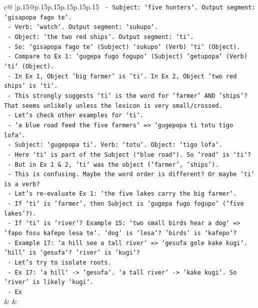 \documentclass{article}
\begin{document}
{\begin{supertabular}{c@{$\;$}|p{.15\linewidth}@{}p{.15\linewidth}p{.15\linewidth}p{.15\linewidth}p{.15\linewidth}p{.15\linewidth}}
{{{\texttt{     {-} Subject: `five hunters`. Output segment: `gisapopa fago te`.} \\
\texttt{     {-} Verb: `watch`. Output segment: `sukupo`.} \\
\texttt{     {-} Object: `the two red ships`. Output segment: `ti`.} \\
\texttt{     {-} So: `gisapopa fago te` (Subject) `sukupo` (Verb) `ti` (Object).} \\
\texttt{     {-} Compare to Ex 1: `gugepa fugo fogupo` (Subject) `getupopa` (Verb) `ti` (Object).} \\
\texttt{     {-} In Ex 1, Object 'big farmer' is `ti`. In Ex 2, Object 'two red ships' is `ti`.} \\
\texttt{     {-} This strongly suggests `ti` is the word for 'farmer' AND 'ships'? That seems unlikely unless the lexicon is very small/crossed.} \\
\texttt{     {-} Let's check other examples for `ti`.} \\
\texttt{     {-} `a blue road feed the five farmers` => `gugepopa ti totu tigo lofa`.} \\
\texttt{       {-} Subject: `gugepopa ti`. Verb: `totu`. Object: `tigo lofa`.} \\
\texttt{       {-} Here `ti` is part of the Subject ("blue road"). So 'road' is `ti`?} \\
\texttt{       {-} But in Ex 1 \& 2, `ti` was the object ('farmer', 'ships').} \\
\texttt{       {-} This is confusing. Maybe the word order is different? Or maybe `ti` is a verb?} \\
\texttt{       {-} Let's re{-}evaluate Ex 1: `the five lakes carry the big farmer`.} \\
\texttt{         {-} If `ti` is 'farmer', then Subject is `gugepa fugo fogupo` ('five lakes'?).} \\
\texttt{         {-} If `ti` is 'river'? Example 15: `two small birds hear a dog` => `fapo fosu kafepo lesa te`. 'dog' is `lesa`? 'birds' is `kafepo`?} \\
\texttt{         {-} Example 17: `a hill see a tall river` => `gesufa gole kake kugi`. 'hill' is `gesufa`? 'river' is `kugi`?} \\
\texttt{       {-} Let's try to isolate roots.} \\
\texttt{       {-} Ex 17: `a hill` {-}> `gesufa`. `a tall river` {-}> `kake kugi`. So 'river' is likely `kugi`.} \\
\texttt{       {-} Ex} \\
            }
        }
    }
    & & \\ \\


\end{supertabular}}
\end{document}
